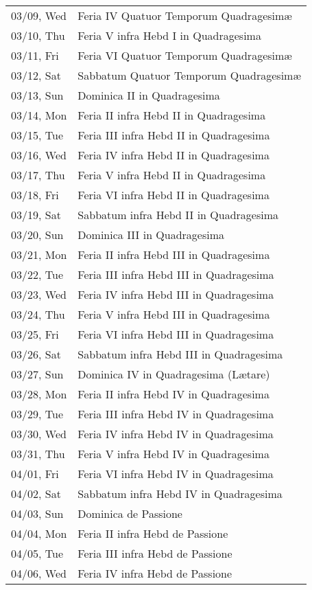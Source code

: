 \documentclass{article}
\begin{document}
\begin{longtable}{ll}
03/09, Wed & Feria IV Quatuor Temporum Quadragesimæ\\
03/10, Thu & Feria V infra Hebd I in Quadragesima\\
03/11, Fri & Feria VI Quatuor Temporum Quadragesimæ\\
03/12, Sat & Sabbatum Quatuor Temporum Quadragesimæ\\
03/13, Sun & Dominica II in Quadragesima\\
03/14, Mon & Feria II infra Hebd II in Quadragesima\\
03/15, Tue & Feria III infra Hebd II in Quadragesima\\
03/16, Wed & Feria IV infra Hebd II in Quadragesima\\
03/17, Thu & Feria V infra Hebd II in Quadragesima\\
03/18, Fri & Feria VI infra Hebd II in Quadragesima\\
03/19, Sat & Sabbatum infra Hebd II in Quadragesima\\
03/20, Sun & Dominica III in Quadragesima\\
03/21, Mon & Feria II infra Hebd III in Quadragesima\\
03/22, Tue & Feria III infra Hebd III in Quadragesima\\
03/23, Wed & Feria IV infra Hebd III in Quadragesima\\
03/24, Thu & Feria V infra Hebd III in Quadragesima\\
03/25, Fri & Feria VI infra Hebd III in Quadragesima\\
03/26, Sat & Sabbatum infra Hebd III in Quadragesima\\
03/27, Sun & Dominica IV in Quadragesima (Lætare)\\
03/28, Mon & Feria II infra Hebd IV in Quadragesima \\
03/29, Tue & Feria III infra Hebd IV in Quadragesima \\
03/30, Wed & Feria IV infra Hebd IV in Quadragesima \\
03/31, Thu & Feria V infra Hebd IV in Quadragesima \\
04/01, Fri & Feria VI infra Hebd IV in Quadragesima \\
04/02, Sat & Sabbatum infra Hebd IV in Quadragesima \\
04/03, Sun & Dominica de Passione\\
04/04, Mon & Feria II infra Hebd de Passione\\
04/05, Tue & Feria III infra Hebd de Passione\\
04/06, Wed & Feria IV infra Hebd de Passione\\

\end{longtable}
\end{document}
